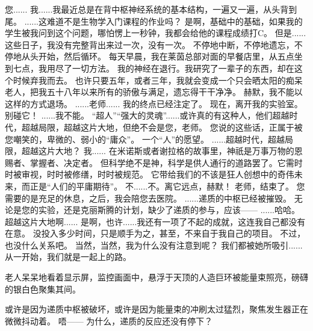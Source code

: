 \documentclass[openany]{book}
\begin{document}
\begin{dialogue}
     您......
     我......我最近总是在背中枢神经系统的基本结构，一遍又一遍，从头背到尾。
     ......这难道不是生物学入门课程的作业吗？
     是啊，基础中的基础，如果我的学生被我问到这个问题，哪怕愣上一秒钟，我都会给他的课程成绩打C。
     但是......这些日子，我没有完整背出来过一次，没有一次。
     不停地中断，不停地遗忘，不停地从头开始，然后循环。
     每天早晨，我在莱茵总部对面的早餐店里，从五点坐到七点，我用尽了一切方法。
     我的神经在退行。我研究了一辈子的东西，却在这个时候弃我而去。
     也许只要五年，或者三年，我就会变成一个只会晒太阳的痴呆老人，把我五十八年以来所有的骄傲与满足，遗忘得干干净净。
     赫默，我不能以这样的方式退场。
     ......老师......
     我的终点已经注定了。
     现在，离开我的实验室。别碰它！
     ......我不能。
     “超人”“强大的灵魂”......或许真的有这种人，他们超越时代，超越局限，超越这片大地，但绝不会是您，老师。
     您说的这些话，正属于被您嘲笑的，卑微的、弱小的“庸众”。
     一个“人”的愿望。
     ......超越时代，超越局限，超越这片大地？
     我......
     在米诺斯或者谢拉格的故事里，神祇是万事万物的恩赐者、掌握者、决定者。
     但科学绝不是神，科学是供人通行的道路罢了。它需时时被审视，时时被修缮，时时被规范。
     它带给我们的不该是狂人创想中的奇伟未来，而正是“人们的平庸期待”。
     不......不。离它远点，赫默！
     老师，结束了。
     您需要的是充足的休息，之后，我会陪您去医院。
     ......递质的中枢已经被摧毁。
     无论是您的实验，还是克丽斯腾的计划，缺少了递质的参与，应该——
     ......哈哈。
     超越这片大地啊......
     是啊，也许......我还有一项了不起的成就，这连我自己都没有在意。
     没投入多少时间，只是顺手为之，甚至，不来自于我自己的项目。
     不过，也没什么关系吧。
     当然，当然，我为什么没有注意到呢？
     我们都被她所吸引......从一开始，我们就是一起上的路。\par
    老人呆呆地看着显示屏，监控画面中，悬浮于天顶的人造巨环被能量束照亮，磅礴的银白色聚集其间。\par
    或许是因为递质中枢被破坏，或许是因为能量束的冲刷太过猛烈，聚焦发生器正在微微抖动着。
     唔——
     为什么，递质的反应还没有停下？

\end{dialogue}
\end{document}
